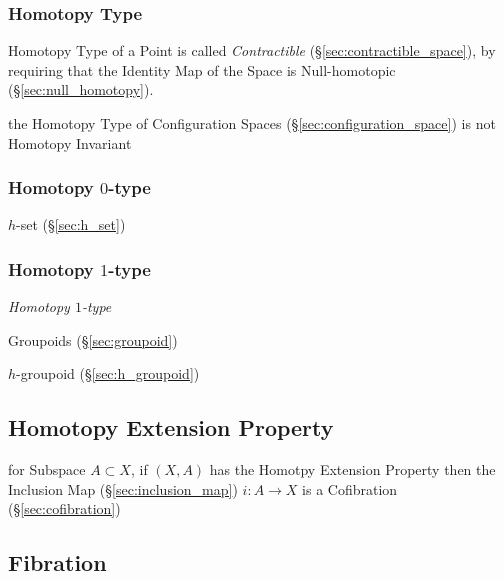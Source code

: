 \subsubsection{Homotopy Type}\label{sec:homotopy_type}

Homotopy Type of a Point is called \emph{Contractible}
(\S\ref{sec:contractible_space}), by requiring that the Identity Map
of the Space is Null-homotopic (\S\ref{sec:null_homotopy}).

the Homotopy Type of Configuration Spaces (\S\ref{sec:configuration_space}) is
not Homotopy Invariant



\subsubsection{Homotopy $0$-type}\label{sec:homotopy_0type}

$h$-set (\S\ref{sec:h_set})



\subsubsection{Homotopy $1$-type}\label{sec:homotopy_1type}

\emph{Homotopy $1$-type}

Groupoids (\S\ref{sec:groupoid})

$h$-groupoid (\S\ref{sec:h_groupoid})



\subsection{Homotopy Extension Property}\label{sec:homotopy_extension}

for Subspace $A \subset X$, if $(X,A)$ has the Homotpy Extension
Property then the Inclusion Map (\S\ref{sec:inclusion_map}) $i : A
\rightarrow X$ is a Cofibration (\S\ref{sec:cofibration})



\subsection{Fibration}\label{sec:fibration}

